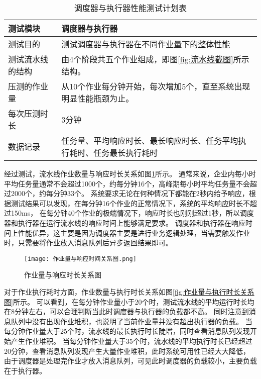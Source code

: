\begin{table}[ht]
  \centering
  \caption{调度器与执行器性能测试计划表}
  \label{tab:调度器与执行器性能测试计划表}
  \renewcommand{\arraystretch}{1.5}
  \begin{tabular}{|p{3cm}|p{10cm}|}
  \hline
  测试模块 & 调度器与执行器 \\ \hline
  测试目的 & 测试调度器与执行器在不同作业量下的整体性能 \\ \hline
  测试流水线的结构 & 由4个阶段共五个作业组成，即图\ref{fig:流水线截图}所示结构。\\ \hline
  压测的作业量 & 从10个作业每分钟开始，每次增加5个，直至系统出现明显性能瓶颈为止。\\ \hline
  每次压测时长 & 3分钟\\ \hline
  数据记录 & 任务量、平均响应时长、最长响应时长、任务平均执行耗时、任务最长执行耗时\\ \hline
  \end{tabular}
\end{table}

经过测试，流水线作业数量与响应时长关系如图\ref{fig:作业量与响应时长关系图}所示。
通常来说，企业内每小时平均任务量通常不会超过1000个，约每分钟16个，高峰期每小时平均任务量不会超过2000个，约每分钟33个。
系统要求无论在何种情况下都能在2秒内给予响应，根据测试结果可以发现，在每分钟16个作业的正常情况下，系统的平均响应时长不超过150ms，
在每分钟40个作业的极端情况下，响应时长也刚刚超过1秒，所以调度器和执行器在运行流水线的响应时间上能够满足要求。
调度器和执行器在响应时间上性能优异，这主要是因为调度器主要是进行业务逻辑处理，当需要触发作业时，只需要将作业放入消息队列后异步返回结果即可。

\begin{figure}[h]
  \centering
  \texttt{[image: 作业量与响应时间关系图.png]}
  \caption{作业量与响应时长关系图}
  \label{fig:作业量与响应时长关系图}
\end{figure}

对于作业执行耗时方面，作业数量与执行时长关系如图\ref{fig:作业量与执行时长关系图}所示。
可以看到，在每分钟作业量小于20个时，测试流水线的平均运行时长均在8分钟左右，可以合理判断当此时调度器与执行器的负载都不高。
同时注意到消息队列中没有出现作业堆积，也说明了当前作业量并没有超出执行器的负载。
当每分钟作业量大于25个时，流水线的最长执行时长陡增，同时查看消息队列发现开始产生作业堆积。
当每分钟作业量大于35个时，流水线的平均执行时长已经超过20分钟，查看消息队列发现产生大量作业堆积，此时系统可用性已经大大降低，
由于调度器是处理完作业才放入消息队列，可见此时调度器的负载较小，主要负载在于执行器。

